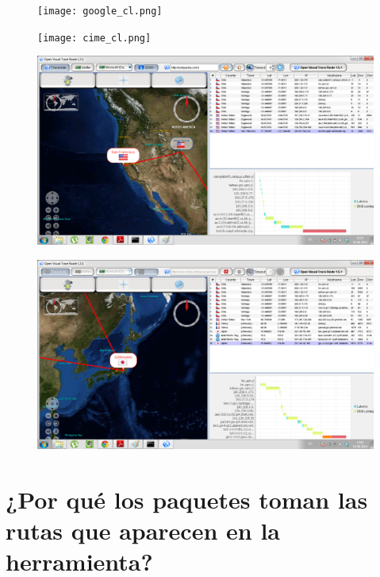 \documentclass{article}
\begin{document}
\begin{figure}[H]
\centering
\texttt{[image: google\_cl.png]}
\end{figure}


\begin{figure}[H]
\centering
\texttt{[image: cime\_cl.png]}
\end{figure}


\begin{figure}[H]
\centering
\includegraphics[width=1\textwidth]{wikipedia.png}
\end{figure}



\begin{figure}[H]
\centering
\includegraphics[width=1\textwidth]{embajada.png}
\end{figure}




\section{¿Por qué los paquetes toman las rutas que aparecen en la herramienta?}
\end{document}
